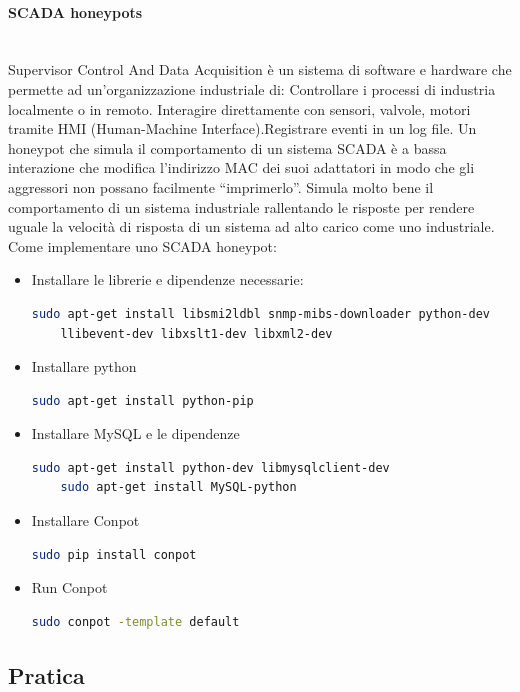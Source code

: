 \documentclass[8pt]{extarticle}
\begin{document}
\paragraph{SCADA honeypots}
\noindent
\\
Supervisor Control And Data Acquisition è un sistema di software e hardware che permette ad un’organizzazione industriale di:
Controllare i processi di industria localmente o in remoto. Interagire direttamente con sensori, valvole, motori tramite HMI 
(Human-Machine Interface).Registrare eventi in un log file. Un honeypot che simula il comportamento di un sistema SCADA è a 
bassa interazione che modifica l’indirizzo MAC dei suoi adattatori in modo che gli aggressori non possano facilmente “imprimerlo”.
Simula molto bene il comportamento di un sistema industriale rallentando le risposte per rendere uguale la velocità di risposta 
di un sistema ad alto carico come uno industriale. Come implementare uno SCADA honeypot:
\begin{itemize}
    \item Installare le librerie e dipendenze necessarie: 
    \begin{lstlisting}[language=bash, basicstyle=\small]
    sudo apt-get install libsmi2ldbl snmp-mibs-downloader python-dev 
    llibevent-dev libxslt1-dev libxml2-dev
    \end{lstlisting}
    \item Installare python
    \begin{lstlisting}[language=bash, basicstyle=\small]
    sudo apt-get install python-pip
    \end{lstlisting}
    \item Installare MySQL e le dipendenze
    \begin{lstlisting}[language=bash, basicstyle=\small]
    sudo apt-get install python-dev libmysqlclient-dev
    sudo apt-get install MySQL-python
    \end{lstlisting}
    \item Installare Conpot
    \begin{lstlisting}[language=bash, basicstyle=\small]
    sudo pip install conpot
    \end{lstlisting}
    \item Run Conpot
    \begin{lstlisting}[language=bash, basicstyle=\small]
    sudo conpot -template default
    \end{lstlisting}
\end{itemize}
\subsection{Pratica}
\end{document}
